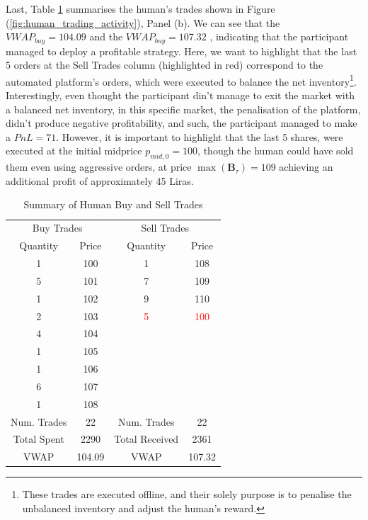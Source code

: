 Last, Table \ref{tab:empirical_human_trades} summarises the human's trades shown in Figure (\ref{fig:human_trading_activity}), Panel (b). We can see that the $VWAP_{buy} = 104.09$ and the $VWAP_{buy} = 107.32$ , indicating that the participant managed to deploy a profitable strategy. Here, we want to highlight that the last 5 orders at the Sell Trades column (highlighted in red) correspond to the automated platform's orders, which were executed to balance the net inventory\footnote{These trades are executed offline, and their solely purpose is to penalise the unbalanced inventory and adjust the human's reward.}. Interestingly, even thought the participant din't manage to exit the market with a balanced net inventory, in this specific market, the penalisation of the platform, didn't produce negative profitability, and such, the participant managed to make a $PnL = 71$. However, it is important to highlight that the last 5 shares, were executed at the initial midprice $p_{mid,0} = 100$, though the human could have sold them even using aggressive orders, at price $\max(\mathbf{B}_{\tau}) = 109$ achieving an additional profit of approximately 45 Liras.
\begin{table}[!htbp]
\centering
\caption{Summary of Human Buy and Sell Trades}
\label{tab:empirical_human_trades}
\begin{tabular}{cc|cc}
\toprule
\multicolumn{2}{c|}{Buy Trades} & \multicolumn{2}{c}{Sell Trades}\\
Quantity & Price  & Quantity & Price  \\
\hline
1 & 100 & 1 & 108\\
5 & 101 & 7 & 109\\
1 & 102  & 9 & 110\\
2 & 103  & \textcolor{red}{5} & \textcolor{red}{100}\\
4 & 104 \\
1 & 105 \\
1 & 106 \\
6 & 107 \\
1 & 108 \\
\hline
Num. Trades & 22 & Num. Trades & 22  \\
Total Spent & 2290 & Total Received & 2361\\
VWAP & 104.09 & VWAP & 107.32  \\
\bottomrule
\end{tabular}
\end{table}

